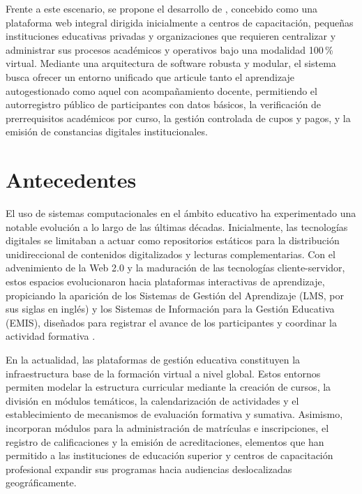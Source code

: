 Frente a este escenario, se propone el desarrollo de , concebido como una plataforma web integral dirigida inicialmente a centros de capacitación, pequeñas instituciones educativas privadas y organizaciones que requieren centralizar y administrar sus procesos académicos y operativos bajo una modalidad 100\,\% virtual. Mediante una arquitectura de software robusta y modular, el sistema busca ofrecer un entorno unificado que articule tanto el aprendizaje autogestionado como aquel con acompañamiento docente, permitiendo el autorregistro público de participantes con datos básicos, la verificación de prerrequisitos académicos por curso, la gestión controlada de cupos y pagos, y la emisión de constancias digitales institucionales.

\section{Antecedentes}

El uso de sistemas computacionales en el ámbito educativo ha experimentado una notable evolución a lo largo de las últimas décadas. Inicialmente, las tecnologías digitales se limitaban a actuar como repositorios estáticos para la distribución unidireccional de contenidos digitalizados y lecturas complementarias. Con el advenimiento de la Web 2.0 y la maduración de las tecnologías cliente-servidor, estos espacios evolucionaron hacia plataformas interactivas de aprendizaje, propiciando la aparición de los Sistemas de Gestión del Aprendizaje (LMS, por sus siglas en inglés) y los Sistemas de Información para la Gestión Educativa (EMIS), diseñados para registrar el avance de los participantes y coordinar la actividad formativa \cite{unesco2023technology}.

En la actualidad, las plataformas de gestión educativa constituyen la infraestructura base de la formación virtual a nivel global. Estos entornos permiten modelar la estructura curricular mediante la creación de cursos, la división en módulos temáticos, la calendarización de actividades y el establecimiento de mecanismos de evaluación formativa y sumativa. Asimismo, incorporan módulos para la administración de matrículas e inscripciones, el registro de calificaciones y la emisión de acreditaciones, elementos que han permitido a las instituciones de educación superior y centros de capacitación profesional expandir sus programas hacia audiencias deslocalizadas geográficamente.

